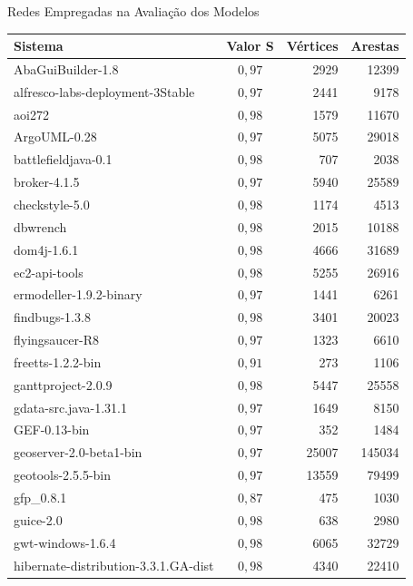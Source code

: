\begin{chapter}{Redes Empregadas na Avaliação dos Modelos}
%
\begin{center}
\begin{longtable}{| p{10cm} | c | r | r |}
	\hline
	\textbf{Sistema} & \textbf{Valor} S & \textbf{Vértices} & \textbf{Arestas} \\ \hline
	\hline
	AbaGuiBuilder-1.8 &  $0,97$ & 2929 & 12399 \\ \hline
	alfresco-labs-deployment-3Stable &  $0,97$ & 2441 & 9178 \\ \hline
	aoi272 &  $0,98$ & 1579 & 11670 \\ \hline
	ArgoUML-0.28 &  $0,97$ & 5075 & 29018 \\ \hline
	battlefieldjava-0.1 &  $0,98$ & 707 & 2038 \\ \hline
	broker-4.1.5 &  $0,97$ & 5940 & 25589 \\ \hline
	checkstyle-5.0 &  $0,98$ & 1174 & 4513 \\ \hline
	dbwrench &  $0,98$ & 2015 & 10188 \\ \hline
	dom4j-1.6.1 &  $0,98$ & 4666 & 31689 \\ \hline
	ec2-api-tools &  $0,98$ & 5255 & 26916 \\ \hline
	ermodeller-1.9.2-binary &  $0,97$ & 1441 & 6261 \\ \hline
	findbugs-1.3.8 &  $0,98$ & 3401 & 20023 \\ \hline
	flyingsaucer-R8 &  $0,97$ & 1323 & 6610 \\ \hline
	freetts-1.2.2-bin &  $0,91$ & 273 & 1106 \\ \hline
	ganttproject-2.0.9 &  $0,98$ & 5447 & 25558 \\ \hline
	gdata-src.java-1.31.1 &  $0,97$ & 1649 & 8150 \\ \hline
	GEF-0.13-bin &  $0,97$ & 352 & 1484 \\ \hline
	geoserver-2.0-beta1-bin &  $0,97$ & 25007 & 145034 \\ \hline
	geotools-2.5.5-bin &  $0,97$ & 13559 & 79499 \\ \hline
	gfp\_0.8.1 &  $0,87$ & 475 & 1030 \\ \hline
	guice-2.0 &  $0,98$ & 638 & 2980 \\ \hline
	gwt-windows-1.6.4 &  $0,98$ & 6065 & 32729 \\ \hline
	hibernate-distribution-3.3.1.GA-dist &  $0,98$ & 4340 & 22410 \\ \hline

\end{longtable}
\end{center}
\end{chapter}
